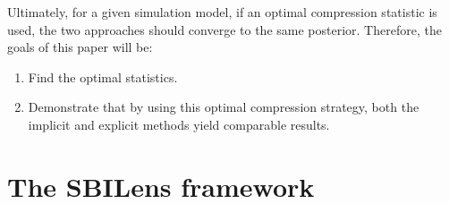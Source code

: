 \documentclass{aa}
\begin{document}
\vspace{1cm}
Ultimately, for a given simulation model, if an optimal compression statistic is used, the two approaches should converge to the same posterior. Therefore, the goals of this paper will be:
\begin{enumerate}
    \item Find the optimal statistics.
    \item Demonstrate that by using this optimal compression strategy, both the implicit and explicit methods yield comparable results.
\end{enumerate}


\section{The SBILens framework}\label{Sec:the SBILens framework}
\end{document}
